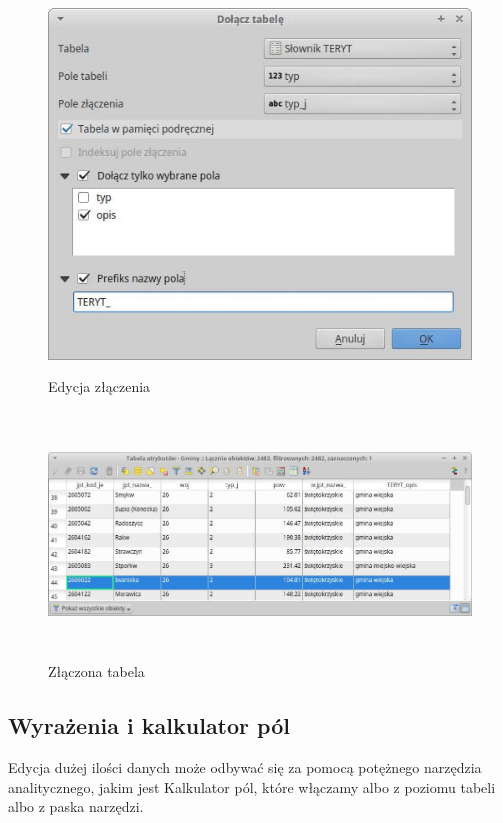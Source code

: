 \documentclass[12pt,a4paper]{book}
\begin{document}
\begin{center}
\begin{figure}
\includegraphics[width=11.998cm,height=9.952cm]{003-zlaczenie-edycja.png}
\caption{Edycja złączenia}
\end{figure}
\end{center}


\begin{center}
\begin{figure}
\includegraphics[width=17cm,height=6.548cm]{003-zlaczenie.jpg}
\caption{Złączona tabela}
\end{figure}
\end{center}
\subsection[Wyrażenia i kalkulator pól]{Wyrażenia i kalkulator pól}
Edycja dużej ilości danych może odbywać się za pomocą potężnego narzędzia analitycznego, jakim jest Kalkulator pól, które włączamy albo z poziomu tabeli albo z paska narzędzi.
\end{document}
